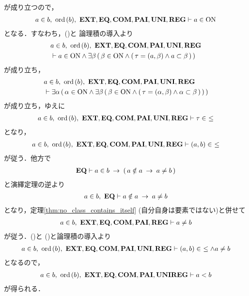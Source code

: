\begin{prf}
\begin{description}
				が成り立つので，
				\begin{align}
					a \in b,\ \ord{b},\ \EXTAX,\EQAX,\COMAX,\PAIAX,\UNIAX,\REGAX 
					\vdash a \in \ON
				\end{align}
				となる．すなわち，()と
				論理積の導入より
				\begin{align}
					&a \in b,\ \ord{b},\ \EXTAX,\EQAX,\COMAX,\PAIAX,\UNIAX,\REGAX \\
					&\vdash a \in \ON \wedge \exists \beta\, (\, \beta \in \ON \wedge 
					(\, \tau = (a,\beta) \wedge a \subset \beta\, )\, )
				\end{align}
				が成り立ち，
				\begin{align}
					&a \in b,\ \ord{b},\ \EXTAX,\EQAX,\COMAX,\PAIAX,\UNIAX,\REGAX \\
					&\vdash \exists \alpha\, (\, \alpha \in \ON \wedge 
					\exists \beta\, (\, \beta \in \ON \wedge 
					(\, \tau = (\alpha,\beta) \wedge \alpha \subset \beta\, )\, )\, )
				\end{align}
				が成り立ち，ゆえに
				\begin{align}
					a \in b,\ \ord{b},\ \EXTAX,\EQAX,\COMAX,\PAIAX,\UNIAX,\REGAX 
					\vdash \tau \in\ \leq
				\end{align}
				となり，
				\begin{align}
					a \in b,\ \ord{b},\ \EXTAX,\EQAX,\COMAX,\PAIAX,\UNIAX,\REGAX 
					\vdash (a,b) \in\ \leq
					\label{fom:element_and_proper_subset_correspond_3}
				\end{align}
				が従う．他方で
				\begin{align}
					\mbox{{\bf EQ}} \vdash a \in b \hspace{0.25em}\rightarrow\hspace{0.25em} (\, a \notin a \hspace{0.25em}\rightarrow\hspace{0.25em} a \neq b\, )
				\end{align}
				と演繹定理の逆より
				\begin{align}
					a \in b,\ \mbox{{\bf EQ}} \vdash a \notin a \hspace{0.25em}\rightarrow\hspace{0.25em} a \neq b
				\end{align}
				となり，定理\ref{thm:no_class_contains_itself}
				(自分自身は要素ではない)と併せて
				\begin{align}
					a \in b,\ \mbox{{\bf EXT}},\mbox{{\bf EQ}},\mbox{\bf COM},\mbox{{\bf PAI}},\mbox{{\bf REG}} \vdash 
					a \neq b
					\label{fom:element_and_proper_subset_correspond_4}
				\end{align}
				が従う．()と
				()と論理積の導入より
				\begin{align}
					a \in b,\ \ord{b},\ \EXTAX,\EQAX,\COMAX,\PAIAX,\UNIAX,\REGAX 
					\vdash (a,b) \in\ \leq \wedge a \neq b
				\end{align}
				となるので，
				\begin{align}
					a \in b,\ \ord{b},\ \EXTAX,\EQAX,\COMAX,\PAIAX,\UNIAX\REGAX 
					\vdash a < b
				\end{align}
				が得られる．
				

\end{description}
\end{prf}
